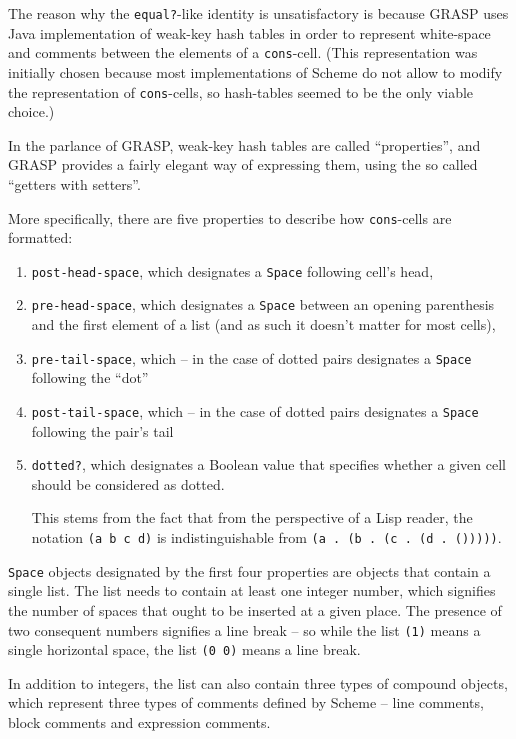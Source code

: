 \documentclass[sigconf]{acmart}
\begin{document}
The reason why the \texttt{equal?}-like identity is unsatisfactory
is because GRASP uses Java implementation of weak-key
hash tables in order to represent white-space and comments
between the elements of a \texttt{cons}-cell. (This
representation was initially chosen because most implementations
of Scheme do not allow to modify the representation of 
\texttt{cons}-cells, so hash-tables seemed to be the only
viable choice.)

In the parlance of GRASP, weak-key hash tables are called
``properties'', and GRASP provides a fairly elegant way
of expressing them, using the so called ``getters with setters''.

More specifically, there are five properties to describe
how \texttt{cons}-cells are formatted: 
\begin{enumerate}
\item \texttt{post-head-space}, which designates a \texttt{Space}
following cell's head,
\item \texttt{pre-head-space}, which designates 
a \texttt{Space} between an opening parenthesis 
and the first element of a list (and as such it doesn't
matter for most cells),
\item \texttt{pre-tail-space}, which -- in the case of dotted pairs
designates a \texttt{Space} following the ``dot''
\item \texttt{post-tail-space}, which -- in the case of dotted pairs
designates a \texttt{Space} following the pair's tail
\item \texttt{dotted?}, which designates a Boolean value that
specifies whether a given cell should be considered as dotted.

This stems from the fact that from the perspective
of a Lisp reader, the notation \texttt{(a b c d)}
is indistinguishable from \texttt{(a . (b . (c . (d . ()))))}.
\end{enumerate}

\texttt{Space} objects designated by the first four properties
are objects that contain a single list. The list needs
to contain at least one integer number, which signifies
the number of spaces that ought to be inserted at a given
place. The presence of two consequent numbers signifies
a line break -- so while the list \texttt{(1)} means a single
horizontal space, the list \texttt{(0 0)} means a line break.

In addition to integers, the list can also contain
three types of compound objects, which represent
three types of comments defined by Scheme -- line comments,
block comments and expression comments.
\end{document}
